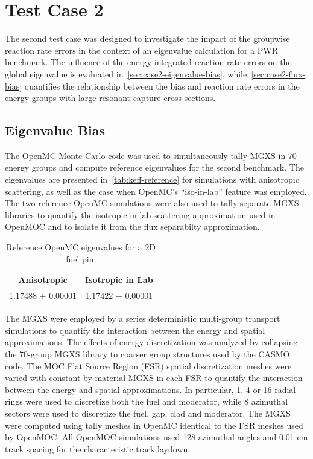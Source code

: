 \section{Test Case 2}
\label{sec:test-case2}

The second test case was designed to investigate the impact of the groupwise reaction rate errors in the context of an eigenvalue calculation for a PWR benchmark. The influence of the energy-integrated reaction rate errors on the global eigenvalue is evaluated in~\autoref{sec:case2-eigenvalue-bias}, while~\autoref{sec:case2-flux-bias} quantifies the relationship between the bias and reaction rate errors in the energy groups with large resonant capture cross sections.

\subsection{Eigenvalue Bias}
\label{sec:case2-eigenvalue-bias}

The OpenMC Monte Carlo code was used to simultaneously tally MGXS in 70 energy groups and compute reference eigenvalues for the second benchmark. The eigenvalues are presented in~\autoref{tab:keff-reference} for simulations with anisotropic scattering, as well as the case when OpenMC's ``iso-in-lab'' feature was employed. The two reference OpenMC simulations were also used to tally separate MGXS libraries to quantify the isotropic in lab scattering approximation used in OpenMOC and to isolate it from the flux separabilty approximation.

\begin{table}[h!]
  \centering
  \caption{Reference OpenMC eigenvalues for a 2D fuel pin.}
  \label{tab:keff-reference} 
  \begin{tabular}{c c}
  \toprule
  {\bf Anisotropic} &
  {\bf Isotropic in Lab} \\
  \midrule
  1.17488 $\pm$ 0.00001 & 1.17422 $\pm$ 0.00001 \\
  \bottomrule
\end{tabular}
\end{table}

The MGXS were employed by a series deterministic multi-group transport simulations to quantify the interaction between the energy and spatial approximations. The effects of energy discretization was analyzed by collapsing the 70-group MGXS library to coarser group structures used by the CASMO code. The MOC Flat Source Region (FSR) spatial discretization meshes were varied with constant-by material MGXS in each FSR to quantify the interaction between the energy and spatial approximations. In particular, 1, 4 or 16 radial rings were used to discretize both the fuel and moderator, while 8 azimuthal sectors were used to discretize the fuel, gap, clad and moderator. The MGXS were computed using tally meshes in OpenMC identical to the FSR meshes used by OpenMOC. All OpenMOC simulations used 128 azimuthal angles and 0.01 cm track spacing for the characteristic track laydown.

